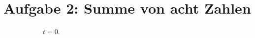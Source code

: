 \chapter{Aufgabe 2: Summe von acht Zahlen}

\begin{figure}[tbp]
 \centering 
 \begin{subfigure}{.33\textwidth}
  \centering 
  \caption{$t=0$.}
 \end{subfigure}
 \begin{subfigure}{.33\textwidth}
  \centering 

\end{subfigure}
\end{figure}
